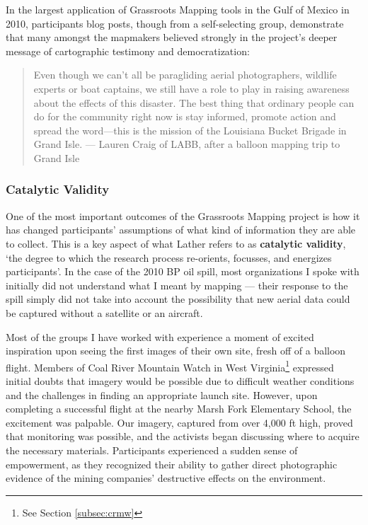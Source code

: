 \documentclass[11pt,oneside,notitlepage]{report}
\begin{document}
{{In the largest application of Grassroots Mapping tools in the Gulf of Mexico in 2010, participants blog posts, though from a self-selecting group, demonstrate that many amongst the mapmakers believed strongly in the project's deeper message of cartographic testimony and democratization:

\begin{quote}
Even though we can’t all be paragliding aerial photographers, wildlife experts or boat captains, we still have a role to play in raising awareness about the effects of this disaster. The best thing that ordinary people can do for the community right now is stay informed, promote action and spread the word—this is the mission of the Louisiana Bucket Brigade in Grand Isle.
--- Lauren Craig of \ac{LABB}, after a balloon mapping trip to Grand Isle \cite{craig2010labb}
\end{quote}

\subsubsection{Catalytic Validity}

One of the most important outcomes of the Grassroots Mapping project is how it has changed participants' assumptions of what kind of information they are able to collect. This is a key aspect of what Lather refers to as \textbf{catalytic validity}, `the degree to which the research process re-orients, focusses, and energizes participants'. In the case of the 2010 BP oil spill, most organizations I spoke with initially did not understand what I meant by mapping --- their response to the spill simply did not take into account the possibility that new aerial data could be captured without a satellite or an aircraft. 

Most of the groups I have worked with experience a moment of excited inspiration upon seeing the first images of their own site, fresh off of a balloon flight. Members of Coal River Mountain Watch in West Virginia\footnote{See Section \ref{subsec:crmw}} expressed initial doubts that imagery would be possible due to difficult weather conditions and the challenges in finding an appropriate launch site. However, upon completing a successful flight at the nearby Marsh Fork Elementary School, the excitement was palpable. Our imagery, captured from over 4,000 ft high, proved that monitoring was possible, and the activists began discussing where to acquire the necessary materials. Participants experienced a sudden sense of empowerment, as they recognized their ability to gather direct photographic evidence of the mining companies' destructive effects on the environment. 

}}
\end{document}
